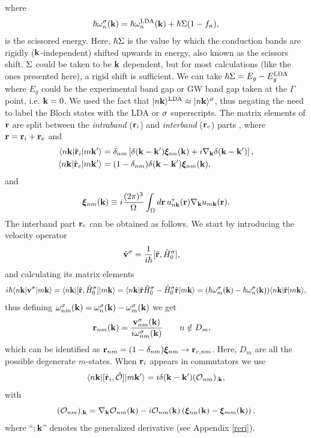 \documentclass[floatfix,prb,aps,superscriptaddress,11pt,preprint,letterpaper]{revtex4}
\begin{document}
where 
\begin{align}\label{chon.78}
\hbar\omega^\sigma_n(\mathbf{k})=\hbar\omega^{\mathrm{LDA}}_n(\mathbf{k})+\hbar\Sigma(1-f_n)
,
\end{align}
is the
 scissored
energy. Here, 
$\hbar\Sigma$ is the value by which the conduction bands are rigidly
($\mathbf{k}$-independent)
 shifted
upwards in energy, also known as the scissors shift. $\Sigma$ could be taken to be
$\mathbf{k}$ dependent, but for most calculations (like the ones presented
here), a rigid shift is sufficient. We can take 
$\hbar\Sigma=E_g-E_g^{\mathrm{LDA}}$ where $E_g$ could be the experimental band gap 
or GW band gap taken at the $\Gamma$ point, i.e. $\mathbf{k}=0$.
We used the fact that 
$| n\mathbf{k} \rangle^{\mathrm{LDA}}\approx| n\mathbf{k} \rangle^\sigma$, thus negating the need to label
the Bloch states with the LDA or $\sigma$ superscripts. 
The matrix elements of $\mathbf{r}$ are split between the {\it intraband} 
($\mathbf{r}_i$) and {\it interband} ($\mathbf{r}_e$) parts , where 
$\mathbf{r}=\mathbf{r}_i+\mathbf{r}_e$ and\cite{adamsJCP53,blountSSP62,aversaPRB95}
\begin{align}\label{rnminn}
\langle n\mathbf{k} |\hat{\mathbf{r}}_i| m\mathbf{k}' \rangle &= \delta_{nm}\left[\delta(\mathbf{k}-\mathbf{k}')\boldsymbol{\xi}_{nn}(\mathbf{k})
+i\nabla_{\mathbf{k}}\delta(\mathbf{k}-\mathbf{k}')\right], \\
\langle n\mathbf{k} |\hat{\mathbf{r}}_e| m\mathbf{k}' \rangle &=
(1-\delta_{nm})\delta(\mathbf{k}-\mathbf{k}')\boldsymbol{\xi}_{nm}(\mathbf{k})
,
\label{rnmenn}
\end{align}
and
\begin{equation}\label{zetann}
\boldsymbol{\xi}_{nm}(\mathbf{k}) \equiv i\frac{(2\pi)^3}{\Omega}\int_{\Omega} d\mathbf{r}\, u^*_{n\mathbf{k}}(\mathbf{r})\nabla_{\mathbf{k}}u_{m\mathbf{k}}(\mathbf{r}).
\end{equation}
The interband part $\mathbf{r}_e$ can
be obtained as follows. 
We start by introducing the 
velocity operator
\begin{align}\label{vop}
\hat{\mathbf{v}}^\sigma&=
\frac{1}{i\hbar}[\hat{\mathbf{r}},\hat{H}^\sigma_0]
,
\end{align}
and calculating its matrix elements
\begin{equation}\label{conhrnm}
i\hbar\langle n\mathbf{k} |
\mathbf{v}^\sigma
| m\mathbf{k} \rangle
=
\langle n\mathbf{k} |
[\hat{\mathbf{r}},\hat{H}^\sigma_0]
| m\mathbf{k} \rangle
=\langle n\mathbf{k} |\hat{\mathbf{r}}\hat{H}^\sigma_0-\hat{H}^\sigma_0\hat{\mathbf{r}}| m\mathbf{k} \rangle
=(\hbar\omega^\sigma_m(\mathbf{k})-\hbar\omega^\sigma_n(\mathbf{k}))\langle n\mathbf{k} |\hat{\mathbf{r}}| m\mathbf{k} \rangle
,
\end{equation}
thus defining $\omega^\sigma_{nm}(\mathbf{k})=\omega^\sigma_n(\mathbf{k})-\omega^\sigma_m(\mathbf{k})$ we get
\begin{align}\label{pmnrmn}
\mathbf{r}_{nm}(\mathbf{k})
&=
\frac{\mathbf{v}^\sigma_{nm}(\mathbf{k})}{i\omega^\sigma_{nm}(\mathbf{k})}
\quad\quad n\notin D_m
,
\end{align} 
which can be identified as 
$\mathbf{r}_{nm}=(1-\delta_{nm})\boldsymbol{\xi}_{nm}\to \mathbf{r}_{e,nm}$.
Here, $D_m$ are all the possible degenerate $m$-states.
When $\mathbf{r}_i$ appears in
commutators we use\cite{aversaPRB95} 
\begin{equation}\label{conmri3n}
\langle n\mathbf{k} |[\hat{\mathbf{r}}_i,\hat{{\cal O}}]| m\mathbf{k}' \rangle
=i\delta(\mathbf{k}-\mathbf{k}')({\cal O}_{nm})_{;\mathbf{k}}
,
\end{equation}  
with
\begin{equation}\label{gendevnn}
({\cal O}_{nm})_{;\mathbf{k}}=
\nabla_{\mathbf{k}}
{\cal O}_{n m}(\mathbf{k})
- 
i
{\cal O}_{nm}(\mathbf{k})
\left(
\boldsymbol{\xi}_{nn}(\mathbf{k})
-
\boldsymbol{\xi}_{mm}(\mathbf{k})
\right)
,
\end{equation} 
where ``$;\mathbf{k}$'' denotes the generalized derivative (see Appendix \ref{reri}). 
\end{document}
